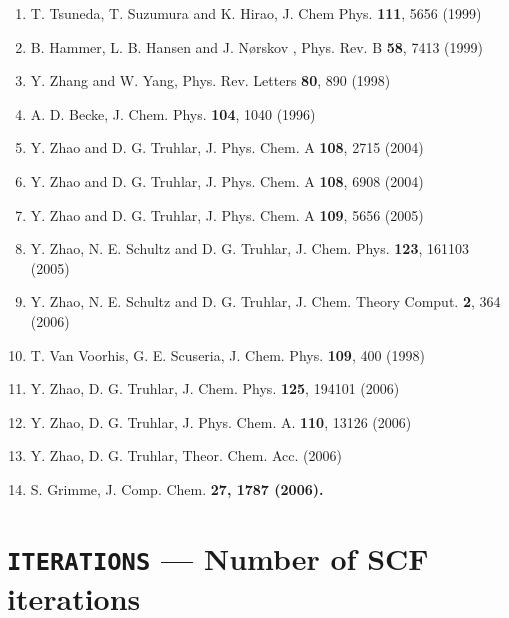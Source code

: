 {\begin{enumerate}
J. Chem Phys. {\bf 110}, 10664 (1999)\\
\item T. Tsuneda, T. Suzumura and K. Hirao,
J. Chem Phys. {\bf 111}, 5656  (1999) \\
\item B. Hammer, L. B. Hansen and J. N{\o}rskov , Phys. Rev. B {\bf 58}, 7413 (1999)\\
\item Y. Zhang and W. Yang, Phys. Rev. Letters {\bf 80}, 890 (1998)\\
\item A. D. Becke, J. Chem. Phys. {\bf 104}, 1040 (1996)\\
\item Y. Zhao and D. G. Truhlar, J. Phys. Chem. A {\bf 108}, 2715 (2004)\\
\item Y. Zhao and D. G. Truhlar, J. Phys. Chem. A {\bf 108}, 6908 (2004)\\
\item Y. Zhao and D. G. Truhlar, J. Phys. Chem. A {\bf 109}, 5656 (2005)\\
\item Y. Zhao, N. E. Schultz and D. G. Truhlar, J. Chem. Phys. {\bf 123}, 161103 (2005)\\
\item Y. Zhao, N. E. Schultz and D. G. Truhlar, J. Chem. Theory Comput. {\bf 2}, 364 (2006)\\
\item T. Van Voorhis, G. E. Scuseria, J. Chem. Phys. {\bf 109}, 400 (1998)\\
\item Y. Zhao, D. G. Truhlar, J. Chem. Phys. {\bf 125}, 194101 (2006)\\
\item Y. Zhao, D. G. Truhlar, J. Phys. Chem. A. {\bf 110}, 13126 (2006)\\
\item Y. Zhao, D. G. Truhlar, Theor. Chem. Acc. (2006)\\
\item S. Grimme, J. Comp. Chem. \bf{27}, 1787 (2006).

\end{enumerate}
}
\onecolumn

\section{{\tt ITERATIONS} --- Number of SCF iterations}

